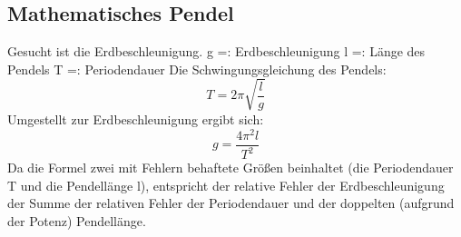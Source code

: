 \subsection{Mathematisches Pendel}
Gesucht ist die Erdbeschleunigung.
\newline
g =: Erdbeschleunigung
\newline
l =: Länge des Pendels
\newline
T =: Periodendauer
\newline
Die Schwingungsgleichung des Pendels:
\begin{equation}
T = 2\pi \sqrt{\frac{l}{g}}
\end{equation}
Umgestellt zur Erdbeschleunigung ergibt sich:
\begin{equation}
g = \frac{4\pi^{2}l}{T^{2}}
\end{equation}
Da die Formel zwei mit Fehlern behaftete Größen beinhaltet (die Periodendauer T und die Pendellänge l), entspricht der relative Fehler der Erdbeschleunigung der Summe der relativen Fehler der Periodendauer und der doppelten (aufgrund der Potenz) Pendellänge.
\begin{table}[thb]
	\centering
	\hline
\end{table}

%    

